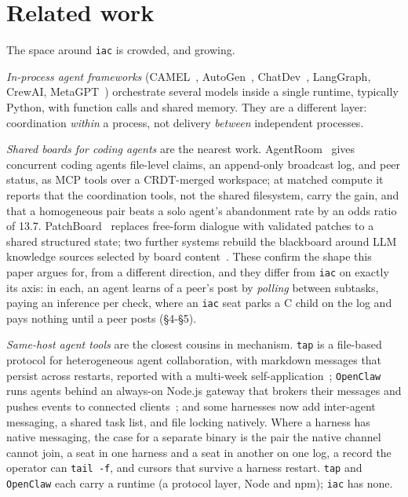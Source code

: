\documentclass[11pt]{article}
\newcommand{\code}[1]{\texttt{#1}}
\begin{document}
\section{Related work}

The space around \code{iac} is crowded, and growing.

\emph{In-process agent frameworks} (CAMEL~\cite{camel}, AutoGen~\cite{autogen}, ChatDev~\cite{chatdev}, LangGraph, CrewAI, MetaGPT~\cite{metagpt}) orchestrate several models inside a single runtime, typically Python, with function calls and shared memory. They are a different layer: coordination \emph{within} a process, not delivery \emph{between} independent processes.

\emph{Shared boards for coding agents} are the nearest work. AgentRoom~\cite{agentroom} gives concurrent coding agents file-level claims, an append-only broadcast log, and peer status, as MCP tools over a CRDT-merged workspace; at matched compute it reports that the coordination tools, not the shared filesystem, carry the gain, and that a homogeneous pair beats a solo agent's abandonment rate by an odds ratio of 13.7. PatchBoard~\cite{patchboard} replaces free-form dialogue with validated patches to a shared structured state; two further systems rebuild the blackboard around LLM knowledge sources selected by board content~\cite{llmbb1,llmbb2}. These confirm the shape this paper argues for, from a different direction, and they differ from \code{iac} on exactly its axis: in each, an agent learns of a peer's post by \emph{polling} between subtasks, paying an inference per check, where an \code{iac} seat parks a C child on the log and pays nothing until a peer posts (\S4-\S5).

\emph{Same-host agent tools} are the closest cousins in mechanism. \code{tap} is a file-based protocol for heterogeneous agent collaboration, with markdown messages that persist across restarts, reported with a multi-week self-application~\cite{tap}; \code{OpenClaw} runs agents behind an always-on Node.js gateway that brokers their messages and pushes events to connected clients~\cite{openclaw}; and some harnesses now add inter-agent messaging, a shared task list, and file locking natively. Where a harness has native messaging, the case for a separate binary is the pair the native channel cannot join, a seat in one harness and a seat in another on one log, a record the operator can \code{tail -f}, and cursors that survive a harness restart. \code{tap} and \code{OpenClaw} each carry a runtime (a protocol layer, Node and npm); \code{iac} has none.
\end{document}
